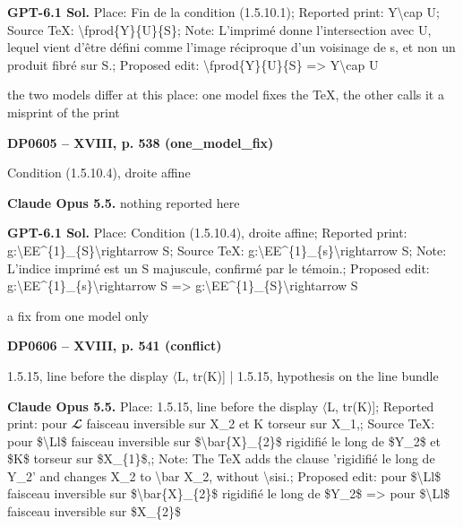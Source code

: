\textbf{GPT-6.1 Sol.} Place: Fin de la condition (1.5.10.1); Reported print: Y\textbackslash{}cap U; Source TeX: \textbackslash{}fprod\{Y\}\{U\}\{S\}; Note: L'imprimé donne l'intersection avec U, lequel vient d'être défini comme l'image réciproque d'un voisinage de s, et non un produit fibré sur S.; Proposed edit: \textbackslash{}fprod\{Y\}\{U\}\{S\} =\allowbreak > Y\textbackslash{}cap U\par
the two models differ at this place: one model fixes the TeX, the other calls it a misprint of the print\par
\par\noindent\hypertarget{DP0605}{}\textbf{DP0605 -- XVIII, p. 538 (one\_model\_fix)}\par
Condition (1.5.10.4), droite affine\par
\textbf{Claude Opus 5.5.} nothing reported here\par
\textbf{GPT-6.1 Sol.} Place: Condition (1.5.10.4), droite affine; Reported print: g:\textbackslash{}EE\textasciicircum{}\{1\}\_\{S\}\textbackslash{}rightarrow S; Source TeX: g:\textbackslash{}EE\textasciicircum{}\{1\}\_\{s\}\textbackslash{}rightarrow S; Note: L'indice imprimé est un S majuscule, confirmé par le témoin.; Proposed edit: g:\textbackslash{}EE\textasciicircum{}\{1\}\_\{s\}\textbackslash{}rightarrow S =\allowbreak > g:\textbackslash{}EE\textasciicircum{}\{1\}\_\{S\}\textbackslash{}rightarrow S\par
a fix from one model only\par
\par\noindent\hypertarget{DP0606}{}\textbf{DP0606 -- XVIII, p. 541 (conflict)}\par
1.5.15, line before the display \ensuremath{\langle}L, tr(K)] | 1.5.15, hypothesis on the line bundle\par
\textbf{Claude Opus 5.5.} Place: 1.5.15, line before the display \ensuremath{\langle}L, tr(K)]; Reported print: pour \ensuremath{𝓛} faisceau inversible sur X\_2 et K torseur sur X\_1,; Source TeX: pour \$\textbackslash{}Ll\$ faisceau inversible sur \$\textbackslash{}bar\{X\}\_\{2\}\$ rigidifié le long de \$Y\_2\$ et \$K\$ torseur sur \$X\_\{1\}\$,; Note: The TeX adds the clause 'rigidifié le long de Y\_2' and changes X\_2 to \textbackslash{}bar X\_2, without \textbackslash{}sisi.; Proposed edit: pour \$\textbackslash{}Ll\$ faisceau inversible sur \$\textbackslash{}bar\{X\}\_\{2\}\$ rigidifié le long de \$Y\_2\$ =\allowbreak > pour \$\textbackslash{}Ll\$ faisceau inversible sur \$X\_\{2\}\$\par

